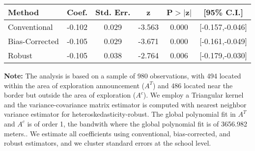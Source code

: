 \begin{table}[htbp]\centering
 \footnotesize 
\begin{tabular}{lccccc}
\hline\hline
Method & Coef. & Std. Err. & z & P$>|$z$|$ & [95\% C.I.] \\ 
\hline \hline  
Conventional & -0.102 & 0.029 & -3.563 & 0.000 & [-0.157,-0.046] \\ 
 Bias-Corrected & -0.105 & 0.029 & -3.671 & 0.000 & [-0.161,-0.049] \\ 
Robust & -0.105 & 0.038 & -2.764 & 0.006 & [-0.179,-0.030] \\ 
  \hline\hline
\end{tabular}
\label{table:rd}
\begin{tablenotes} 
  \justifying \tiny \textbf{Note: }    
   The analysis is based on a sample of 980 observations, with 494 located within the area of exploration announcement ($A^{T}$) and 486 located near the border but outside the area of exploration  ($A^{c}$). 
           We employ a Triangular kernel and the variance-covariance matrix estimator is computed with nearest neighbor variance estimator for heteroskedasticity-robust. The global polynomial fit in  $A^{T}$ and $A^{c}$ is of order 1, the bandwith where the global polynomial fit is of 3656.982 meters.. We estimate all coefficients using conventional, bias-corrected, and robust estimators, and we cluster standard errors at the school level. \end{tablenotes} 
 \end{table} 
